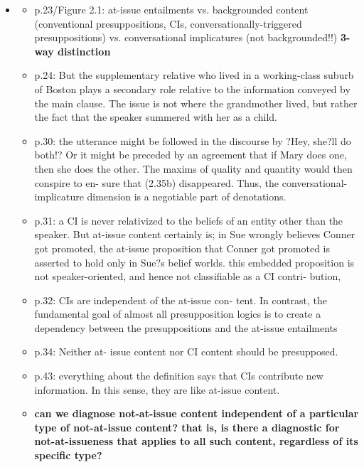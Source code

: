 \documentclass[11pt,fleqn]{article}
\newcommand{\6}{\mbox{$[\hspace*{-.6mm}[$}}
\newcommand{\9}{\mbox{$]\hspace*{-.6mm}]$}}
\begin{document}
\begin{itemize}

\item \citealt{potts05}

\begin{itemize}

\item p.23/Figure 2.1: at-issue entailments vs. backgrounded content (conventional presuppositions, CIs, conversationally-triggered presuppositions) vs. conversational implicatures (not backgrounded!!) {\bf 3-way distinction}

\item p.24: But the supplementary relative who lived in a working-class suburb of Boston plays a secondary role relative to the information conveyed by the main clause. The issue is not where the grandmother lived, but rather the fact that the speaker summered with her as a child.

\item p.30: the utterance might be followed in the discourse by ?Hey, she?ll do both!? Or it might be preceded by an agreement that if Mary does one, then she does the other. The maxims of quality and quantity would then conspire to en- sure that (2.35b) disappeared. Thus, the conversational-implicature dimension is a negotiable part of denotations.

\item p.31: a CI is never relativized to the beliefs of an entity other than the speaker. But at-issue content certainly is; in Sue wrongly believes Conner got promoted, the at-issue proposition that Conner got promoted is asserted to hold only in Sue?s belief worlds. this embedded proposition is not speaker-oriented, and hence not classifiable as a CI contri- bution,

\item p.32:  CIs are independent of the at-issue con- tent. In contrast, the fundamental goal of almost all presupposition logics is to create a dependency between the presuppositions and the at-issue entailments

\item p.34: Neither at- issue content nor CI content should be presupposed.

\item p.43: everything about the definition says that CIs contribute new information. In this sense, they are like at-issue content.

\item {\bf can we diagnose not-at-issue content independent of a particular type of not-at-issue content? that is, is there a diagnostic for not-at-issueness that applies to all such content, regardless of its specific type?}


\end{itemize}
\end{itemize}
\end{document}
